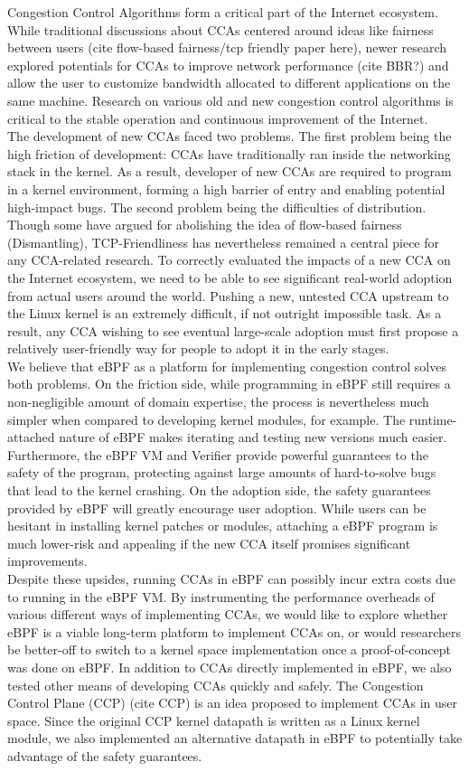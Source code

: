 \documentclass[../main.tex]{subfiles}
\begin{document}
Congestion Control Algorithms form a critical part of the Internet ecosystem. While traditional discussions about CCAs centered around ideas like fairness between users (cite flow-based fairness/tcp friendly paper here), newer research explored potentials for CCAs to improve network performance (cite BBR?) and allow the user to customize bandwidth allocated to different applications on the same machine. Research on various old and new congestion control algorithms is critical to the stable operation and continuous improvement of the Internet. \\
The development of new CCAs faced two problems. The first problem being the high friction of development: CCAs have traditionally ran inside the networking stack in the kernel. As a result, developer of new CCAs are required to program in a kernel environment, forming a high barrier of entry and enabling potential high-impact bugs. The second problem being the difficulties of distribution. Though some have argued for abolishing the idea of flow-based fairness (Dismantling), TCP-Friendliness has nevertheless remained a central piece for any CCA-related research. To correctly evaluated the impacts of a new CCA on the Internet ecosystem, we need to be able to see significant real-world adoption from actual users around the world. Pushing a new, untested CCA upstream to the Linux kernel is an extremely difficult, if not outright impossible task. As a result, any CCA wishing to see eventual large-scale adoption must first propose a relatively user-friendly way for people to adopt it in the early stages. \\
We believe that eBPF as a platform for implementing congestion control solves both problems. On the friction side, while programming in eBPF still requires a non-negligible amount of domain expertise, the process is nevertheless much simpler when compared to developing kernel modules, for example. The runtime-attached nature of eBPF makes iterating and testing new versions much easier. Furthermore, the eBPF VM and Verifier provide powerful guarantees to the safety of the program, protecting against large amounts of hard-to-solve bugs that lead to the kernel crashing. On the adoption side, the safety guarantees provided by eBPF will greatly encourage user adoption. While users can be hesitant in installing kernel patches or modules, attaching a eBPF program is much lower-risk and appealing if the new CCA itself promises significant improvements.\\
Despite these upsides, running CCAs in eBPF can possibly incur extra costs due to running in the eBPF VM. By instrumenting the performance overheads of various different ways of implementing CCAs, we would like to explore whether eBPF is a viable long-term platform to implement CCAs on, or would researchers be better-off to switch to a kernel space implementation once a proof-of-concept was done on eBPF. In addition to CCAs directly implemented in eBPF, we also tested other means of developing CCAs quickly and safely. The Congestion Control Plane (CCP) (cite CCP) is an idea proposed to implement CCAs in user space. Since the original CCP kernel datapath is written as a Linux kernel module, we also implemented an alternative datapath in eBPF to potentially take advantage of the safety guarantees.
\end{document}
